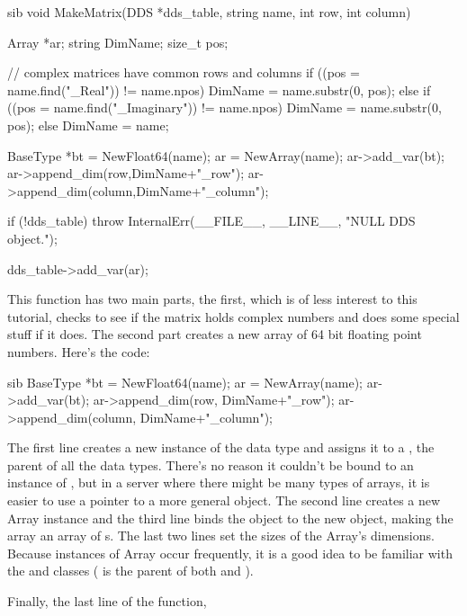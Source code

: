\documentclass{dods-paper}
\begin{document}
\begin{vcode}{sib} 
void 
MakeMatrix(DDS *dds_table, string name, int row, int column)
{
    Array *ar; 
    string DimName;
    size_t pos;
        
    // complex matrices have common rows and columns
    if ((pos = name.find("_Real")) != name.npos)
        DimName = name.substr(0, pos);
    else{
        if ((pos = name.find("_Imaginary")) != name.npos)
            DimName = name.substr(0, pos);
        else
            DimName = name;
    }

    BaseType *bt =  NewFloat64(name);    
    ar = NewArray(name);
    ar->add_var(bt);
    ar->append_dim(row,DimName+"_row");
    ar->append_dim(column,DimName+"_column");
        
    if (!dds_table)
        throw InternalErr(__FILE__, __LINE__, "NULL DDS object.");
   
    dds_table->add_var(ar);
}
\end{vcode}

This function has two main parts, the first, which is of less interest
to this tutorial, checks to see if the matrix holds complex numbers
and does some special stuff if it does. The second part creates a new
array of 64 bit floating point numbers. Here's the code:

  
\begin{vcode}{sib}
   BaseType *bt = NewFloat64(name);   
   ar = NewArray(name);
   ar->add_var(bt);
   ar->append_dim(row, DimName+"_row");
   ar->append_dim(column, DimName+"_column");
\end{vcode}
 

The first line creates a new instance of the  data type and
assigns it to a , the parent of all the data types. There's no
reason it couldn't be bound to an instance of , but in a server
where there might be many types of arrays, it is easier to use a pointer to a
more general object.  The second line creates a new Array instance and the
third line binds the  object to the new  object,
making the array an array of s. The last two lines set the sizes
of the Array's dimensions.  Because instances of Array occur frequently, it
is a good idea to be familiar with the 
and 
classes ( is the parent of both  and ).

Finally, the last line of the function,
\end{document}
